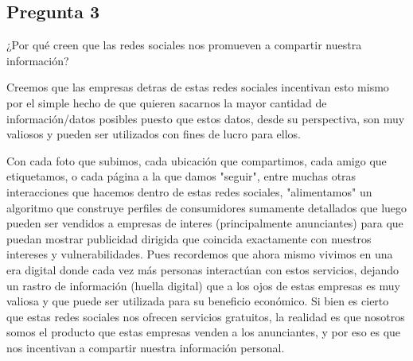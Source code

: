 \subsection{Pregunta 3}

¿Por qué creen que las redes sociales nos promueven a compartir nuestra información?

\begin{respuesta}

Creemos que las empresas detras de estas redes sociales incentivan esto mismo por el simple hecho de que quieren sacarnos la mayor cantidad de información/datos posibles puesto que estos datos, desde su perspectiva, son muy valiosos y pueden ser utilizados con fines de lucro para ellos.

Con cada foto que subimos, cada ubicación que compartimos, cada amigo que etiquetamos, o cada página a la que damos "seguir", entre muchas otras interacciones que hacemos dentro de estas redes sociales, "alimentamos" un algoritmo que construye perfiles de consumidores sumamente detallados que luego pueden ser vendidos a empresas de interes (principalmente anunciantes) para que puedan mostrar publicidad dirigida que coincida exactamente con nuestros intereses y vulnerabilidades. Pues recordemos que ahora mismo vivimos en una era digital donde cada vez más personas interactúan con estos servicios, dejando un rastro de información (huella digital) que a los ojos de estas empresas es muy valiosa y que puede ser utilizada para su beneficio económico. Si bien es cierto que estas redes sociales nos ofrecen servicios gratuitos, la realidad es que nosotros somos el producto que estas empresas venden a los anunciantes, y por eso es que nos incentivan a compartir nuestra información personal.

\end{respuesta}
